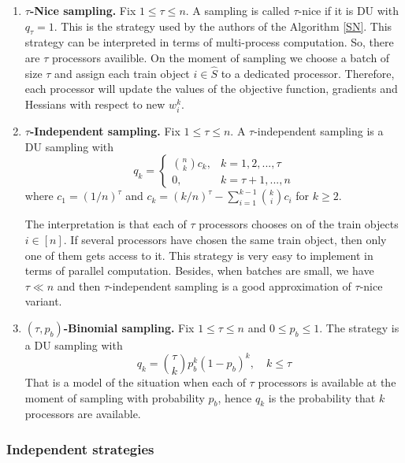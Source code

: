 \documentclass{article}
\theoremstyle{definition}
\theoremstyle{assumption}
\theoremstyle{lemma}
\theoremstyle{theorem}
\theoremstyle{proposition}
\begin{document}
	\begin{enumerate}
		\item \textbf{$\tau$-Nice sampling.}\label{nice} Fix $1 \leqslant \tau \leqslant n$. A sampling is called $\tau$-nice if it is DU with $q_\tau = 1$. This is the strategy used by the authors of the Algorithm \ref{SN}. This strategy can be interpreted in terms of multi-process computation. So, there are $\tau$ processors availible. On the moment of sampling we choose a batch of size $\tau$ and assign each train object $i \in \hat S$ to a dedicated processor. Therefore, each processor will update the values of the objective function, gradients and Hessians with respect to new $w_i^k$.
		
		\item \textbf{$\tau$-Independent sampling.}\label{tau-ind} Fix $1 \leqslant \tau \leqslant n$. A $\tau$-independent sampling is a DU sampling with 
		\begin{equation} 
			q_k = 
			\begin{cases}
				\binom{n}{k}c_k, & k = 1, 2, ..., \tau \\
				0, & k = \tau + 1, ..., n
			\end{cases}
		\end{equation}
		where $c_1 = (1/n)^\tau$ and $c_k = (k/n)^\tau - \sum \limits_{i=1}^{k-1} \binom{k}{i}c_i$ for $k \geqslant 2$.
		
		The interpretation is that each of $\tau$ processors chooses on of the train objects $i \in [n]$. If several processors have chosen the same train object, then only one of them gets access to it. This strategy is very easy to implement in terms of parallel computation. Besides, when batches are small, we have $\tau \ll n$ and then $\tau$-independent sampling is a good approximation of $\tau$-nice variant.
		
		\item \textbf{$(\tau, p_b)$-Binomial sampling.}\label{tau-bin} Fix $1 \leqslant \tau \leqslant n$ and $0 \leqslant p_b \leqslant 1$. The strategy is a DU sampling with
		\begin{equation}
			q_k = \binom{\tau}{k}p_b^k(1 - p_b)^k, \quad k \leqslant \tau
		\end{equation}
		That is a model of the situation when each of $\tau$ processors is available at the moment of sampling with probability $p_b$, hence $q_k$ is the probability that $k$ processors are available.
	\end{enumerate}

	\subsubsection{Independent strategies}
	
\end{document}
